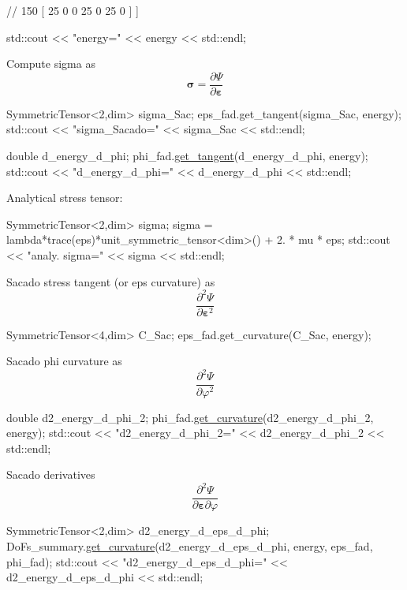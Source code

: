 \begin{DoxyCode}
\textcolor{comment}{//              150 [ 25 0 0 25 0 25 0 ] ]}

 std::cout << \textcolor{stringliteral}{"energy="} << energy << std::endl;
\end{DoxyCode}
 Compute sigma as \[ \boldsymbol{\sigma} = \frac{\partial \Psi}{\partial \boldsymbol{\varepsilon}} \] 
\begin{DoxyCode}
SymmetricTensor<2,dim> sigma\_Sac;
eps\_fad.get\_tangent(sigma\_Sac, energy);
std::cout << \textcolor{stringliteral}{"sigma\_Sacado="} << sigma\_Sac << std::endl;

\textcolor{keywordtype}{double} d\_energy\_d\_phi;
phi\_fad.\hyperlink{classSacado__Wrapper_1_1SW__double2_ad51ba1e79171d60861b28098dfef903d}{get\_tangent}(d\_energy\_d\_phi, energy);
std::cout << \textcolor{stringliteral}{"d\_energy\_d\_phi="} << d\_energy\_d\_phi << std::endl;
\end{DoxyCode}
 Analytical stress tensor\+: 
\begin{DoxyCode}
SymmetricTensor<2,dim> sigma;
sigma = lambda*trace(eps)*unit\_symmetric\_tensor<dim>() + 2. * mu * eps;
std::cout << \textcolor{stringliteral}{"analy. sigma="} << sigma << std::endl;
\end{DoxyCode}
 Sacado stress tangent (or eps curvature) as \[ \frac{\partial^2 \Psi}{\partial \boldsymbol{\varepsilon}^2} \] 
\begin{DoxyCode}
SymmetricTensor<4,dim> C\_Sac;
eps\_fad.get\_curvature(C\_Sac, energy);
\end{DoxyCode}
 Sacado phi curvature as \[ \frac{\partial^2 \Psi}{\partial \varphi^2} \] 
\begin{DoxyCode}
\textcolor{keywordtype}{double} d2\_energy\_d\_phi\_2;
phi\_fad.\hyperlink{classSacado__Wrapper_1_1SW__double2_a7d3f3a21cd842645af9861bf50308825}{get\_curvature}(d2\_energy\_d\_phi\_2, energy);
std::cout << \textcolor{stringliteral}{"d2\_energy\_d\_phi\_2="} << d2\_energy\_d\_phi\_2 << std::endl;
\end{DoxyCode}
 Sacado derivatives \[ \frac{\partial^2 \Psi}{\partial \boldsymbol{\varepsilon} \partial \varphi} \] 
\begin{DoxyCode}
SymmetricTensor<2,dim> d2\_energy\_d\_eps\_d\_phi;
DoFs\_summary.\hyperlink{classSacado__Wrapper_1_1DoFs__summary_adf29bfda10814ecee9572a4751d34db0}{get\_curvature}(d2\_energy\_d\_eps\_d\_phi, energy, eps\_fad, phi\_fad);
std::cout << \textcolor{stringliteral}{"d2\_energy\_d\_eps\_d\_phi="} << d2\_energy\_d\_eps\_d\_phi << std::endl;
\end{DoxyCode}

